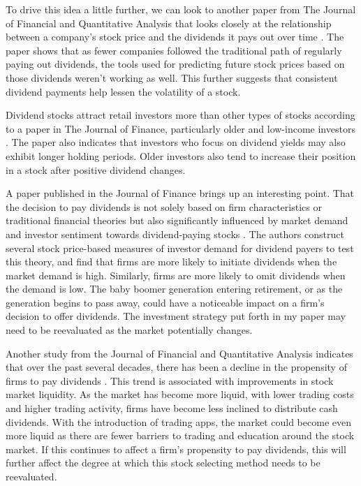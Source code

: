 \documentclass[12pt]{article}
\begin{document}
To drive this idea a little further, we can look to another paper from The Journal of Financial and Quantitative Analysis that looks closely at the relationship between a company's stock price and the dividends it pays out over time \citep{Kim2013}. The paper shows that as fewer companies followed the traditional path of regularly paying out dividends, the tools used for predicting future stock prices based on those dividends weren't working as well. This further suggests that consistent dividend payments help lessen the volatility of a stock.

Dividend stocks attract retail investors more than other types of stocks according to a paper in The Journal of Finance, particularly older and low-income investors \citep{Graham2006}. The paper also indicates that investors who focus on dividend yields may also exhibit longer holding periods. Older investors also tend to increase their position in a stock after positive dividend changes.

A paper published in the Journal of Finance brings up an interesting point. That the decision to pay dividends is not solely based on firm characteristics or traditional financial theories but also significantly influenced by market demand and investor sentiment towards dividend-paying stocks \citep{Baker2004}. The authors construct several stock price-based measures of investor demand for dividend payers to test this theory, and find that firms are more likely to initiate dividends when the market demand is high. Similarly, firms are more likely to omit dividends when the demand is low. The baby boomer generation entering retirement, or as the generation begins to pass away, could have a noticeable impact on a firm’s decision to offer dividends. The investment strategy put forth in my paper may need to be reevaluated as the market potentially changes.

Another study from the Journal of Financial and Quantitative Analysis indicates that over the past several decades, there has been a decline in the propensity of firms to pay dividends \citep{Banerjee2007}. This trend is associated with improvements in stock market liquidity. As the market has become more liquid, with lower trading costs and higher trading activity, firms have become less inclined to distribute cash dividends. With the introduction of trading apps, the market could become even more liquid as there are fewer barriers to trading and education around the stock market. If this continues to affect a firm’s propensity to pay dividends, this will further affect the degree at which this stock selecting method needs to be reevaluated.
\end{document}
